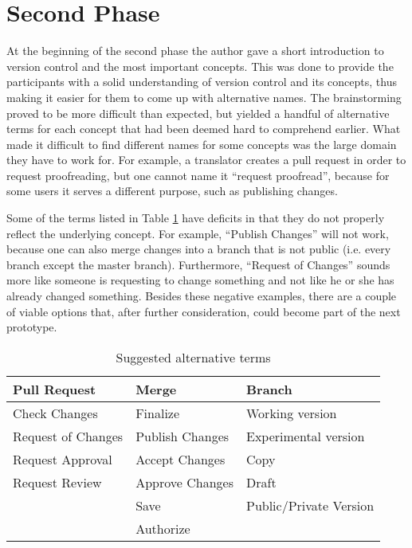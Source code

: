 
\section{Second Phase}
At the beginning of the second phase the author gave a short introduction to version control and the most important concepts. This was done to provide the participants with a solid understanding of version control and its concepts, thus making it easier for them to come up with alternative names. The brainstorming proved to be more difficult than expected, but yielded a handful of alternative terms for each concept that had been deemed hard to comprehend earlier. What made it difficult to find different names for some concepts was the large domain they have to work for. For example, a translator creates a pull request in order to request proofreading, but one cannot name it “request proofread”, because for some users it serves a different purpose, such as publishing changes.

Some of the terms listed in Table \ref{table:alt-terminology} have deficits in that they do not properly reflect the underlying concept. For example, “Publish Changes” will not work, because one can also merge changes into a branch that is not public (i.e. every branch except the master branch). Furthermore, “Request of Changes” sounds more like someone is requesting to change something and not like he or she has already changed something. Besides these negative examples, there are a couple of viable options that, after further consideration, could become part of the next prototype.

\begin{table}[h!]
\begin{tabular}{|l|l|l|}
\hline
\rowcolor[HTML]{EFEFEF}
{\bf Pull Request} & {\bf Merge} & {\bf Branch} \\ \hline
Check Changes      & Finalize                   & Working version        \\
Request of Changes & Publish Changes            & Experimental version   \\
Request Approval   & Accept Changes             & Copy                   \\
Request Review     & Approve Changes            & Draft                  \\
                   & Save                       & Public/Private Version \\
                   & Authorize                  &                        \\ \hline
\end{tabular}
\centering
\caption{Suggested alternative terms}
\label{table:alt-terminology}
\end{table}

